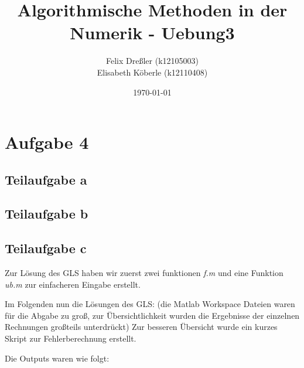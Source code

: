 \documentclass[11pt,titlepage]{article}
\title{Algorithmische Methoden in der Numerik - Uebung3}
\author{Felix Dreßler (k12105003) \\ Elisabeth Köberle (k12110408)}
\date{\today} %
\begin{document}
\maketitle

	\section{Aufgabe 4}
		\subsection{Teilaufgabe a}
			
			
			
		\subsection{Teilaufgabe b}
			
		
		\subsection{Teilaufgabe c}
			Zur Lösung des GLS haben wir zuerst zwei funktionen \emph{f.m} und eine Funktion \emph{ub.m} zur einfacheren Eingabe erstellt.
			
			
			
				
			Im Folgenden nun die Lösungen des GLS: (die Matlab Workspace Dateien waren für die Abgabe zu groß, zur Übersichtlichkeit wurden die Ergebnisse der einzelnen Rechnungen großteils unterdrückt)
			Zur besseren Übersicht wurde ein kurzes Skript zur Fehlerberechnung erstellt.
			
			
			
			Die Outputs waren wie folgt:
			
\end{document}
